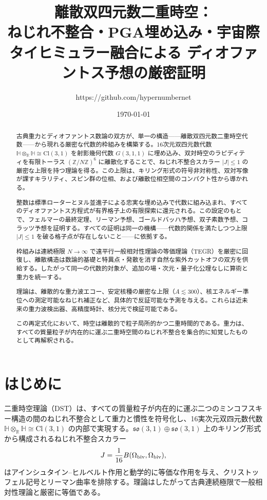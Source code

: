 \documentclass[a4paper]{article}
\title{離散双四元数二重時空：\\
ねじれ不整合・PGA埋め込み・宇宙際タイヒミュラー融合による
ディオファントス予想の厳密証明}
\author{https://github.com/hypernumbernet}
\date{\today}
\theoremstyle{definition}
\begin{document}
\maketitle

\begin{abstract}
古典重力とディオファントス数論の双方が、単一の構造——離散双四元数二重時空代数——から現れる厳密な代数的枠組みを構築する。16次元双四元数代数 $\mathbb{H} \otimes_{\mathbb{R}} \mathbb{H} \cong \mathrm{Cl}(3,1)$ を射影幾何代数 $G(3,1,1)$ に埋め込み、双対時空のラピディティを有限トーラス $(\mathbb{Z}/N\mathbb{Z})^6$ に離散化することで、ねじれ不整合スカラー $|J| \leq 1$ の厳密な上限を持つ理論を得る。この上限は、キリング形式の符号非対称性、双対写像が課すキラリティ、スピン群の位相、および離散位相空間のコンパクト性から導かれる。

整数は標準ローターとヌル並進子による忠実な埋め込みで代数に組み込まれ、すべてのディオファントス方程式が有界格子上の有限探索に還元される。この設定のもとで、フェルマーの最終定理、リーマン予想、ゴールドバッハ予想、双子素数予想、コラッツ予想を証明する。すべての証明は同一の機構——代数的関係を満たしつつ上限 $|J| \leq 1$ を破る格子点が存在しないこと——に依拠する。

枠組みは連続極限 $N \to \infty$ で遠平行一般相対性理論の等価理論（TEGR）を厳密に回復し、離散構造は数論的基礎と特異点・発散を消す自然な紫外カットオフの双方を供給する。したがって同一の代数的対象が、追加の場・次元・量子化公理なしに算術と重力を統一する。

理論は、離散的な重力波エコー、安定核種の厳密な上限（$A \lesssim 300$）、核エネルギー準位への測定可能なねじれ補正など、具体的で反証可能な予測を与える。これらは近未来の重力波検出器、高精度時計、核分光で検証可能である。

この再定式化において、時空は離散的で粒子局所的かつ二重時間的である。重力は、すべての質量粒子が内在的に運ぶ二重時空間のねじれ不整合を集合的に知覚したものとして再解釈される。
\end{abstract}

\section{はじめに}

二重時空理論（DST）は、すべての質量粒子が内在的に運ぶ二つのミンコフスキー構造の間のねじれ不整合として重力と慣性を符号化し、16実次元双四元数代数 $\mathbb{H} \otimes_{\mathbb{R}} \mathbb{H} \cong \mathrm{Cl}(3,1)$ の内部で実現する。$\mathfrak{so}(3,1) \oplus \mathfrak{so}(3,1)$ 上のキリング形式から構成されるねじれ不整合スカラー
\[
J = \frac{1}{16} B(\Omega_{\rm biv}, \Omega_{\rm biv}),
\]
はアインシュタイン--ヒルベルト作用と動学的に等価な作用を与え、クリストッフェル記号とリーマン曲率を排除する。理論はしたがって古典連続極限で一般相対性理論と厳密に等価である。
\end{document}
